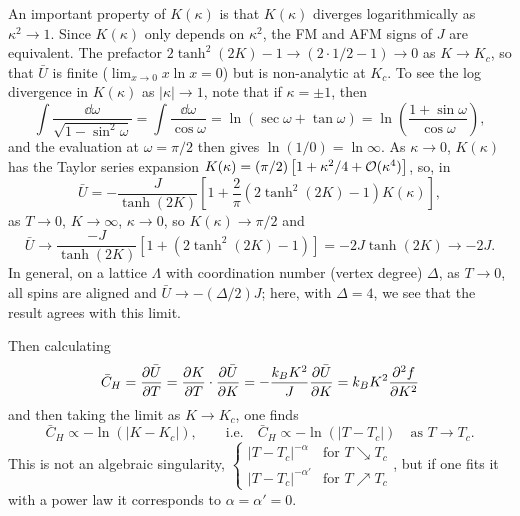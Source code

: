 An important property of $K(\kappa)$ is that $K(\kappa)$ diverges logarithmically as $\kappa^2\to 1$.
Since $K(\kappa)$ only depends on $\kappa^2$, the FM and AFM signs of $J$ are equivalent. The prefactor
$2\tanh^2(2K)-1\to(2\cdot1/2-1)\to 0$ as $K\to K_c$, so that $\bar U$ is finite
($\lim_{x\to 0}x\ln x = 0$) but is non-analytic at $K_c$. To see the log divergence in $K(\kappa)$ as
$|\kappa|\to 1$, note that if $\kappa = \pm 1$, then
\begin{equation}
  \int\frac{\dd\omega}{\sqrt{1-\sin^2\omega}} = \int\frac{\dd\omega}{\cos\omega}
  = \ln(\sec\omega+\tan\omega) = \ln\left(\frac{1+\sin\omega}{\cos\omega}\right),
\end{equation}
and the evaluation at $\omega = \pi/2$ then gives $\ln(1/0) = \ln\infty$. As $\kappa\to 0$,
$K(\kappa)$ has the Taylor series expansion
$K(\kappa) = (\pi/2)\left[1+\kappa^2/4+\mathcal{O}(\kappa^4)\right]$, so, in
\begin{equation}
  \bar U = -\frac{J}{\tanh(2K)}\left[1+\frac{2}{\pi}\left(2\tanh^2(2K)-1\right)K(\kappa)\right],
\end{equation}
as $T\to 0$, $K\to\infty$, $\kappa\to 0$, so $K(\kappa)\to\pi/2$ and
\begin{equation}
  \bar U\to\frac{-J}{\tanh(2K)}\left[1+(2\tanh^2(2K)-1)\right] = -2J\tanh(2K)\to -2J .
\end{equation}
In general, on a lattice $\Lambda$ with coordination number (vertex degree) $\Delta$, as $T\to 0$, all
spins are aligned and $\bar U\to-(\Delta/2)J$; here, with $\Delta = 4$, we see that the result agrees
with this limit.

Then calculating
\begin{equation}
  \bar C_H = \frac{\partial \bar U}{\partial T} = \frac{\partial K}{\partial T}\cdot\frac{\partial \bar U}{\partial K} = -\frac{k_{B} K^2}{J}\frac{\partial \bar U}{\partial K}
  = k_{B} K^2\frac{\partial^2f}{\partial K^2}
\end{equation}
and then taking the limit as $K\to K_c$, one finds
\begin{equation}
  \bar C_H\propto-\ln(|K-K_c|),\qquad\text{i.e.}\quad \bar C_H\propto-\ln(|T-T_c|)\quad\text{as } T\to T_c .
\end{equation}
This is not an algebraic singularity,
$\begin{cases}|T-T_c|^{-\alpha} & \text{for } T\searrow T_c\\ |T-T_c|^{-\alpha'} & \text{for } T\nearrow T_c\end{cases}$,
but if one fits it with a power law it corresponds to $\alpha = \alpha' = 0$.

